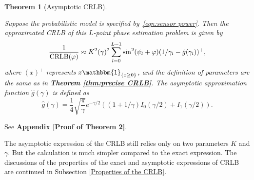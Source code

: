 \documentclass[journal,twocolumn]{IEEEtran}
\newtheorem{theorem}{\bf Theorem}
\theoremstyle{nonumberplain}
\begin{document}
    \begin{theorem}[Asymptotic CRLB] \label{thm:asymptotic CRLB} \mbox{}\par
        Suppose the probabilistic model is specified by~\eqref{eqn:sensor power}. Then the approximated CRLB of this $L$-point phase estimation problem is given by 
        \begin{equation}
            \frac{1}{{\rm CRLB}(\varphi)}\approx K^2(\bar{\gamma})^2 \sum_{l=0}^{L-1}\sin^2(\psi_l+\varphi)(1/\gamma_l-\hat{g}(\gamma_l))^{+},
            \label{eqn:asymptotic CRLB}
        \end{equation}
        where $(x)^{+}$ represents ${x{\mathbbm{1}}_{\{x\geq 0\}}}$, and the definition of parameters are the same as in {\bf Theorem \ref{thm:precise CRLB}}. The asymptotic approximation function $\hat{g}(\gamma)$ is defined as 
        \begin{equation}
            \hat{g}(\gamma) = \frac{1}{4} \sqrt{\frac{\pi}{\gamma}}e^{-\gamma/2}\left((1+1/\gamma)I_0(\gamma/2) + I_1(\gamma/2)\right).
            \label{eqn:definition g function}
        \end{equation}
    \end{theorem}
    \begin{IEEEproof}
        See {\bf Appendix \ref{Proof of Theorem 2}}. 
    \end{IEEEproof}
    
        The asymptotic expression of the CRLB still relies only on two parameters $K$ and $\bar{\gamma}$. But the calculation is much simpler compared to the exact expression. 
        The discussions of the properties of the exact and asymptotic expressions of CRLB are continued in Subsection \ref{Properties of the CRLB}.
        
\end{document}
